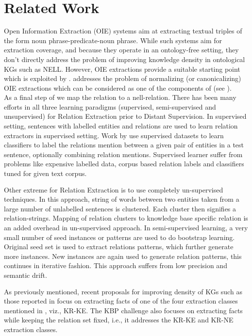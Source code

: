 \section{Related Work}
\label{sec:related}

Open Information Extraction (OIE) systems \cite{textrunner,reverb,ollie} aim at extracting textual triples of the form noun phrase-predicate-noun phrase. While such systems aim for extraction coverage, and because  they operate in an ontology-free setting, they don't directly address the problem of improving knowledge density in ontological KGs such as NELL. 
However, OIE extractions provide a suitable starting point which is exploited by \system{}. \cite{canopy} addresses the problem of normalizing (or canonicalizing) OIE extractions which can be considered as one of the components of \system{} (see ). 
\\As a final step of \system{} we map the relation to a nell-relation. There has been many efforts in all three learning paradigms (supervised, semi-supervised and unsupervised) 
for Relation Extraction prior to Distant Supervision. In supervised setting, sentences with labelled entities and relations are used to learn relation extractors in supervised setting.
Work by \cite{zhou122007tree} use supervised datasets to learn classifiers to label the relations mention between a given pair of entities in a test sentence, optionally combining relation mentions.
Supervised learner suffer from problems like expensive labelled data, corpus based relation labels and classifiers tuned for given text corpus.

Other extreme for Relation Extraction is to use completely un-supervised techniques. In this approach, string of words between two entities taken from a large number of unlabelled 
sentences is clustered. Each cluster then signifies a relation-strings. Mapping of relation clusters to knowledge base specific relation is an added overhead in un-supervised approach.
In semi-supervised learning, a very small number of seed instances or patterns are used to do bootstrap learning. \cite{rozenfeld2008self}
Original seed set is used to extract relations patterns, which further generate more instances. New instances are again used to generate relation patterns,
this continues in iterative fashion. This approach suffers from low precision and semantic drift.

As previously mentioned, recent proposals for improving density of KGs such as those reported in \cite{gardner2013improving,gardner2014incorporating} focus on extracting facts of one of the four extraction classes mentioned in , viz., KR-KE. The KBP challenge \cite{surdeanu2013overview}  also focuses on extracting facts while keeping the relation set fixed, i.e., it addresses the KR-KE and KR-NE extraction classes.

